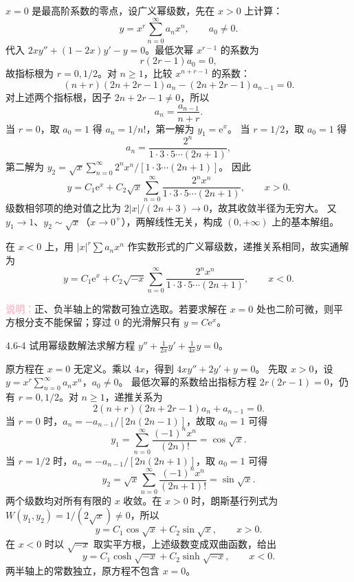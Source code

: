 \documentclass[UTF8,a4paper,11pt]{ctexart}
\newcommand{\e}{\mathrm e}
\newcommand{\note}[1]{\par\smallskip\noindent\textcolor{pink}{\bfseries 说明：}#1\par\smallskip}
\begin{document}
\begin{solution}
$x=0$ 是最高阶系数的零点，设广义幂级数，先在 $x>0$ 上计算：
\[
y=x^r\sum_{n=0}^{\infty}a_nx^n,\qquad a_0\ne0.
\]
代入 $2xy''+(1-2x)y'-y=0$。最低次幂 $x^{r-1}$ 的系数为
\[
r(2r-1)a_0=0,
\]
故指标根为 $r=0,1/2$。对 $n\ge1$，比较 $x^{n+r-1}$ 的系数：
\[
(n+r)(2n+2r-1)a_n-(2n+2r-1)a_{n-1}=0.
\]
对上述两个指标根，因子 $2n+2r-1\ne0$，所以
\[
a_n=\frac{a_{n-1}}{n+r}.
\]
当 $r=0$，取 $a_0=1$ 得 $a_n=1/n!$，第一解为 $y_1=\e^x$。
当 $r=1/2$，取 $a_0=1$ 得
\[
a_n=\frac{2^n}{1\cdot3\cdot5\cdots(2n+1)},
\]
第二解为 $y_2=\sqrt{x}\sum_{n=0}^{\infty}2^nx^n/[1\cdot3\cdots(2n+1)]$。
因此
\[
\boxed{y=C_1\e^x+C_2\sqrt{x}\sum_{n=0}^{\infty}
\frac{2^nx^n}{1\cdot3\cdot5\cdots(2n+1)},\qquad x>0.}
\]
级数相邻项的绝对值之比为 $2|x|/(2n+3)\to0$，故其收敛半径为无穷大。
又 $y_1\to1$、$y_2\sim\sqrt{x}$（$x\to0^+$），两解线性无关，构成 $(0,+\infty)$ 上的基本解组。

在 $x<0$ 上，用 $|x|^r\sum a_nx^n$ 作实数形式的广义幂级数，递推关系相同，故实通解为
\[
\boxed{y=C_1\e^x+C_2\sqrt{-x}\sum_{n=0}^{\infty}
\frac{2^nx^n}{1\cdot3\cdot5\cdots(2n+1)},\qquad x<0.}
\]
\note{正、负半轴上的常数可独立选取。若要求解在 $x=0$ 处也二阶可微，则平方根分支不能保留；穿过 $0$ 的光滑解只有 $y=C\e^x$。}
\end{solution}

\begin{problem}{4.6-4}
试用幂级数解法求解方程
$\displaystyle y''+\frac{1}{2x}y'+\frac{1}{4x}y=0$。
\end{problem}

\begin{solution}
原方程在 $x=0$ 无定义。乘以 $4x$，得到 $4xy''+2y'+y=0$。
先取 $x>0$，设 $y=x^r\sum_{n=0}^{\infty}a_nx^n$，$a_0\ne0$。
最低次幂的系数给出指标方程 $2r(2r-1)=0$，仍有 $r=0,1/2$。对 $n\ge1$，递推关系为
\[
2(n+r)(2n+2r-1)a_n+a_{n-1}=0.
\]
当 $r=0$ 时，$a_n=-a_{n-1}/[2n(2n-1)]$，故取 $a_0=1$ 可得
\[
y_1=\sum_{n=0}^{\infty}\frac{(-1)^nx^n}{(2n)!}=\cos\sqrt{x}.
\]
当 $r=1/2$ 时，$a_n=-a_{n-1}/[2n(2n+1)]$，取 $a_0=1$ 可得
\[
y_2=\sqrt{x}\sum_{n=0}^{\infty}\frac{(-1)^nx^n}{(2n+1)!}=\sin\sqrt{x}.
\]
两个级数均对所有有限的 $x$ 收敛。在 $x>0$ 时，朗斯基行列式为
$W(y_1,y_2)=1/(2\sqrt{x})\ne0$，所以
\[
\boxed{y=C_1\cos\sqrt{x}+C_2\sin\sqrt{x},\qquad x>0.}
\]
在 $x<0$ 时以 $\sqrt{-x}$ 取实平方根，上述级数变成双曲函数，给出
\[
\boxed{y=C_1\cosh\sqrt{-x}+C_2\sinh\sqrt{-x},\qquad x<0.}
\]
两半轴上的常数独立，原方程不包含 $x=0$。
\end{solution}
\end{document}
